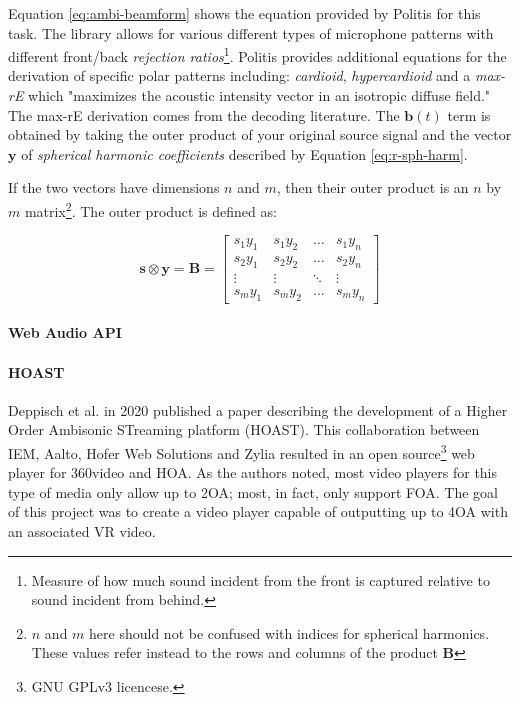 Equation \ref{eq:ambi-beamform} shows the equation provided by Politis \cite{politis2016jsambisonics} for this task. The library allows for various different types of microphone patterns with different front/back \textit{rejection ratios}\footnote{Measure of how much sound incident from the front is captured relative to sound incident from behind.}. Politis \cite{politis2016jsambisonics} provides additional equations for the derivation of specific polar patterns including: \textit{cardioid}, \textit{hypercardioid} and a \textit{max-rE} which "maximizes the acoustic intensity vector in an isotropic diffuse field." The max-rE derivation comes from the decoding literature. The $\mathbf{b}(t)$ term is obtained by taking the outer product of your original source signal and the vector $\mathbf{y}$ of \textit{spherical harmonic coefficients} described by Equation \ref{eq:r-sph-harm}.

If the two vectors have dimensions $n$ and $m$, then their outer product is an $n$ by $m$ matrix\footnote{$n$ and $m$ here should not be confused with indices for spherical harmonics. These values refer instead to the rows and columns of the product $\mathbf{B}$}. The outer product is defined as: 

\begin{equation}
\mathbf{s} \otimes \mathbf{y}=\mathbf{B}=\left[\begin{array}{cccc}
s_{1} y_{1} & s_{1} y_{2} & \ldots & s_{1} y_{n} \\
s_{2} y_{1} & s_{2} y_{2} & \ldots & s_{2} y_{n} \\
\vdots & \vdots & \ddots & \vdots \\
s_{m} y_{1} & s_{m} y_{2} & \ldots & s_{m} y_{n}
\end{array}\right]
\end{equation}

\paragraph{Web Audio API}

\paragraph{HOAST}

Deppisch et al. \cite{deppisch2020hoast} in 2020 published a paper describing the development of a Higher Order Ambisonic STreaming platform (HOAST). This collaboration between IEM, Aalto, Hofer Web Solutions and Zylia resulted in an open source\footnote{GNU GPLv3 licencese.} web player for 360\textdegree  video and HOA. As the authors noted, most video players for this type of media only allow up to 2OA; most, in fact, only support FOA. The goal of this project was to create a video player capable of outputting up to 4OA with an associated VR video. 

